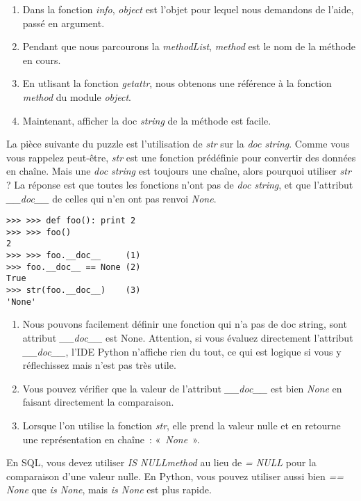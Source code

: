 \begin{enumerate}
    \item Dans la fonction \emph{info}, \emph{object} est l’objet pour lequel nous demandons de l’aide, passé en argument.
    \item Pendant que nous parcourons la \emph{methodList}, \emph{method} est le nom de la méthode en cours.
    \item En utlisant la fonction \emph{getattr}, nous obtenons une référence à la fonction \emph{method} du module \emph{object}.
    \item Maintenant, afficher la doc \emph{string} de la méthode est facile.
\end{enumerate}

La pièce suivante du puzzle est l’utilisation de \emph{str} sur la \emph{doc string}. Comme vous vous rappelez peut-être, \emph{str} est une fonction prédéfinie pour convertir des données en chaîne. Mais une \emph{doc string} est toujours une chaîne, alors pourquoi utiliser \emph{str} ? La réponse est que toutes les fonctions n’ont pas de \emph{doc string}, et que l’attribut \emph{\_\_doc\_\_} de celles qui n’en ont pas renvoi \emph{None}.

\begin{example}
\begin{lstlisting}
>>> >>> def foo(): print 2
>>> >>> foo()
2
>>> >>> foo.__doc__     (1)
>>> foo.__doc__ == None (2)
True
>>> str(foo.__doc__)    (3)
'None'
\end{lstlisting}
\end{example}

\begin{enumerate}
    \item Nous pouvons facilement définir une fonction qui n’a pas de doc string, sont attribut \emph{\_\_doc\_\_} est None. Attention, si vous évaluez directement l’attribut \emph{\_\_doc\_\_}, l'IDE Python n’affiche rien du tout, ce qui est logique si vous y réflechissez mais n’est pas très utile. 
    \item Vous pouvez vérifier que la valeur de l’attribut \emph{\_\_doc\_\_} est bien \emph{None} en faisant directement la comparaison.
    \item Lorsque l’on utilise la fonction \emph{str}, elle prend la valeur nulle et en retourne une représentation en chaîne~: «~\emph{None}~».
\end{enumerate}

{En SQL, vous devez utiliser \emph{IS NULLmethod} au lieu de \emph{= NULL} pour la comparaison d’une valeur nulle. En Python, vous pouvez utiliser aussi bien \emph{== None} que \emph{is None}, mais \emph{is None} est plus rapide.}

